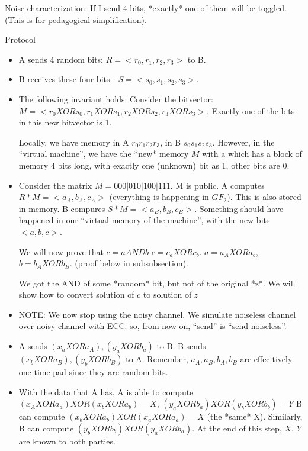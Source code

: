 Noise characterization: If I send 4 bits, *exactly* one of them will be toggled.
(This is for pedagogical simplification).

Protocol

\begin{itemize}
\item A sends 4 random bits: $R = < r_0, r_1, r_2, r_3 >$ to B.
\item B receives these four bits - $ S = < s_0, s_1, s_2, s_3 >$.
\item The following invariant holds: Consider the bitvector:
  $ M =  <r_0 XOR s_0, r_1 XOR s_1, r_2 XOR s_2, r_3 XOR s_3 > $. Exactly one of the bits in this new bitvector is 1.

  Locally, we have memory in A $r_0 r_1 r_2 r_3$, in B $s_0 s_1 s_2 s_3$. However, in the ``virtual machine'', we have
  the *new* memory $M$ with a which has a block of memory 4 bits long, with exactly one (unknown) bit as 1,
  other bits are 0.

\item Consider the matrix $M = 0 0 0 | 0 1 0 | 1 0 0 | 1 1 1$. M is public.
  A computes $R * M = <a_A, b_A, c_A>$ (everything is happening in $GF_2$). This is also stored in memory.
  B compures $S * M = <a_B, b_B, c_B>$. Something should have happened in our ``virtual memory of the machine'', with the
  new bits $<a, b, c>$.

  We will now prove that $c = a AND b$ $c = c_a XOR c_b$. $a = a_A XOR a_b$, $b = b_A XOR b_B$. (proof below in subsubsection).

  We got the AND of some *random* bit, but not of the original *z*. We will show how to convert solution of $c$ to solution of $z$


\item NOTE: We now stop using the noisy channel. We simulate noiseless channel over noisy channel with ECC. so, from now on,
  ``send'' is ``send noiseless''.

\item A sends $(x_a XOR a_A), (y_a XOR b_a)$ to B.
  B sends $(x_b XOR a_B), (y_b XOR b_B)$ to A. Remember, $a_A, a_B, b_A, b_B$ are effecitively one-time-pad since they
  are random bits.

\item With the data that A has, A is able to compute $(x_A XOR a_a) XOR (x_b XOR a_b) = X$, $(y_a XOR b_a) XOR (y_b XOR b_b) = Y$
  B can compute $(x_b XOR a_b) XOR (x_a XOR a_a) = X$ (the *same* X). Similarly, B can compute
  $(y_b XOR b_b) XOR (y_a XOR b_a)$. At the end of this step, $X$, $Y$ are known to both parties.


\end{itemize}
